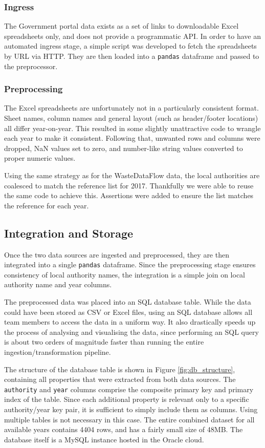 \documentclass[11pt,conference]{IEEEtran}
\begin{document}
\subsubsection{Ingress}
The Government portal data exists as a set of links to downloadable Excel spreadsheets only, and does not provide a programmatic API. In order to have an automated ingress stage, a simple script was developed to fetch the spreadsheets by URL via HTTP. They are then loaded into a \texttt{pandas} dataframe and passed to the preprocessor.
\subsubsection{Preprocessing}
The Excel spreadsheets are unfortunately not in a particularly consistent format. Sheet names, column names and general layout (such as header/footer locations) all differ year-on-year. This resulted in some slightly unattractive code to wrangle each year to make it consistent. Following that, unwanted rows and columns were dropped, NaN values set to zero, and number-like string values converted to proper numeric values.

Using the same strategy as for the WasteDataFlow data, the local authorities are coalesced to match the reference list for 2017. Thankfully we were able to reuse the same code to achieve this. Assertions were added to ensure the list matches the reference for each year.
\subsection{Integration and Storage}
Once the two data sources are ingested and preprocessed, they are then integrated into a single \texttt{pandas} dataframe. Since the preprocessing stage ensures consistency of local authority names, the integration is a simple join on local authority name and year columns.


The preprocessed data was placed into an SQL database table. While the data could have been stored as CSV or Excel files, using an SQL database allows all team members to access the data in a uniform way. It also drastically speeds up the process of analysing and visualising the data, since performing an SQL query is about two orders of magnitude faster than running the entire ingestion/transformation pipeline.

The structure of the database table is shown in Figure \ref{fig:db_structure}, containing all properties that were extracted from both data sources. The \texttt{authority} and \texttt{year} columns comprise the composite primary key and primary index of the table. Since each additional property is relevant only to a specific authority/year key pair, it is sufficient to simply include them as columns. Using multiple tables is not necessary in this case. The entire combined dataset for all available years contains 4404 rows, and has a fairly small size of 48MB. The database itself is a MySQL instance hosted in the Oracle cloud.
\end{document}
